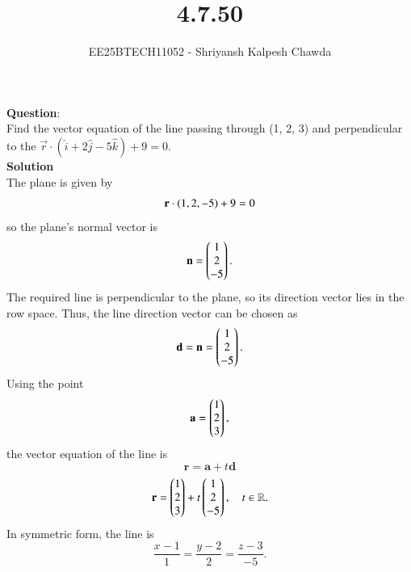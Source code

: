 \documentclass[journal]{IEEEtran}
\numberwithin{equation}{enumi}
\numberwithin{figure}{enumi}
\begin{document}
	
	
	\vspace{3cm}
	
	\title{4.7.50}
	\author{EE25BTECH11052 - Shriyansh Kalpesh Chawda}
	\maketitle
	\textbf{Question}:\\
	Find the vector equation of the line passing through (1, 2, 3) and perpendicular to the $\vec{r}\cdot(\hat{i} + 2\hat{j} - 5\hat{k}) + 9 = 0$.
	\\
	\textbf{Solution}\\
The plane is given by
		\begin{equation}
			\mathbf r \cdot \left(1, 2, -5\right) + 9 = 0
		\end{equation}
		so the plane's normal vector is
		\begin{equation}
			\mathbf n = \begin{pmatrix}1 \\ 2 \\ -5\end{pmatrix}.
		\end{equation}
		The required line is perpendicular to the plane, so its direction vector lies in the row space. Thus, the line direction vector can be chosen as
		\begin{equation}
			\mathbf d = \mathbf n = \begin{pmatrix}1 \\ 2 \\ -5\end{pmatrix}.
		\end{equation}
Using the point
		\begin{equation}
			\mathbf a = \begin{pmatrix}1 \\ 2 \\ 3\end{pmatrix},
		\end{equation}
		the vector equation of the line is
		\begin{equation}
			\mathbf r = \mathbf a + t\mathbf d
		\end{equation}
		\begin{equation}
			\mathbf r = \begin{pmatrix}1 \\ 2 \\ 3\end{pmatrix} + t \begin{pmatrix}1 \\ 2 \\ -5\end{pmatrix}, \quad t \in \mathbb R.
		\end{equation}
In symmetric form, the line is
		\begin{equation}
			\frac{x-1}{1} = \frac{y-2}{2} = \frac{z-3}{-5}.
		\end{equation}
\end{document}
